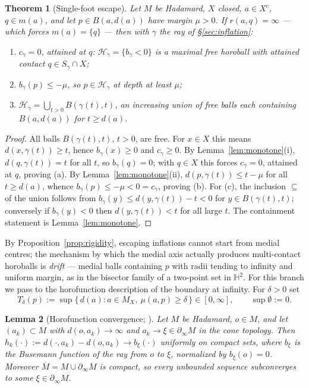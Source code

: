 \documentclass[11pt]{article}
\newtheorem{theorem}{Theorem}[section]
\newtheorem{lemma}[theorem]{Lemma}
\theoremstyle{remark}
\newcommand{\X}{X}
\newcommand{\Mx}{M_{\X}}
\newcommand{\Hb}[1]{\mathcal{H}_{#1}}
\newcommand{\Sb}[1]{S_{#1}}
\newcommand{\B}{B}
\newcommand{\bdry}{\partial_{\infty}}
\begin{document}
\begin{theorem}[Single-foot escape]\label{thm:branch-one}
Let $M$ be Hadamard, $\X$ closed, $a\in\X^{c}$, $q\in m(a)$, and let
$p\in\B(a,d(a))$ have margin $\mu>0$. If $r(a,q)=\infty$ --- which
forces $m(a)=\{q\}$ --- then with $\gamma$ the ray of
\S\ref{sec:inflation}:
\begin{enumerate}[label=(\alph*)]
\item $c_{\gamma}=0$, attained at $q$: $\Hb{\gamma}=\{b_{\gamma}<0\}$
is a maximal free horoball with attained contact
$q\in \Sb{\gamma}\cap\X$;
\item $b_{\gamma}(p)\le-\mu$, so $p\in\Hb{\gamma}$ at depth at least
$\mu$;
\item $\Hb{\gamma}=\bigcup_{t>0}\B(\gamma(t),t)$, an increasing union
of free balls each containing $\B(a,d(a))$ for $t\ge d(a)$.
\end{enumerate}
\end{theorem}

\begin{proof}
All balls $\B(\gamma(t),t)$, $t>0$, are free. For $x\in\X$ this
means $d(x,\gamma(t))\ge t$, hence $b_{\gamma}(x)\ge0$ and
$c_{\gamma}\ge0$. By Lemma~\ref{lem:monotone}(i),
$d(q,\gamma(t))=t$ for all $t$, so $b_{\gamma}(q)=0$; with $q\in\X$
this forces $c_{\gamma}=0$, attained at $q$, proving (a). By
Lemma~\ref{lem:monotone}(ii), $d(p,\gamma(t))\le t-\mu$ for all
$t\ge d(a)$, whence $b_{\gamma}(p)\le-\mu<0=c_{\gamma}$, proving (b).
For (c), the inclusion $\subseteq$ of the union follows from
$b_{\gamma}(y)\le d(y,\gamma(t))-t<0$ for $y\in\B(\gamma(t),t)$;
conversely if $b_{\gamma}(y)<0$ then $d(y,\gamma(t))<t$ for all large
$t$. The containment statement is Lemma~\ref{lem:monotone}.
\end{proof}

By Proposition~\ref{prop:rigidity}, escaping inflations
cannot start from medial centres; the mechanism by which the medial axis
actually produces multi-contact horoballs is \emph{drift} --- medial
balls containing $p$ with radii tending to infinity and uniform margin,
as in the bisector family of a two-point set in $\mathbb{H}^{2}$. For
this branch we pass to the horofunction description of the boundary at
infinity. For $\delta>0$ set
\[
T_{\delta}(p):=\sup\bigl\{\,d(a) : a\in\Mx,\ \mu(a,p)\ge\delta\,\bigr\}
\in[0,\infty],\qquad \sup\emptyset:=0 .
\]

\begin{lemma}[Horofunction convergence; {\cite[II.8.13]{BH}}]
\label{lem:horofn}
Let $M$ be Hadamard, $o\in M$, and let $(a_{k})\subset M$ with
$d(o,a_{k})\to\infty$ and $a_{k}\to\xi\in\bdry M$ in the cone
topology. Then
$h_{k}(\cdot):=d(\cdot,a_{k})-d(o,a_{k})\longrightarrow
b_{\xi}(\cdot)$ uniformly on compact sets, where $b_{\xi}$ is the
Busemann function of the ray from $o$ to $\xi$, normalized by
$b_{\xi}(o)=0$. Moreover $\overline{M}=M\cup\bdry M$ is compact, so
every unbounded sequence subconverges to some $\xi\in\bdry M$.
\end{lemma}
\end{document}
